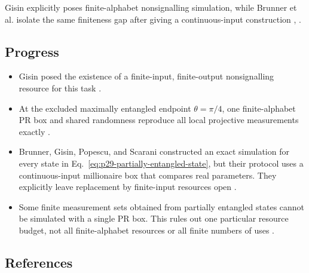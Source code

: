 Gisin explicitly poses finite-alphabet nonsignalling simulation, while
Brunner et al. isolate the same finiteness gap after giving a continuous-input
construction ,
.

\subsection*{Progress}

\begin{itemize}
  \item Gisin posed the existence of a finite-input, finite-output
  nonsignalling resource for this task
  .

  \item At the excluded maximally entangled endpoint $\theta=\pi/4$, one
  finite-alphabet PR box and shared randomness reproduce all local projective
  measurements exactly .

  \item Brunner, Gisin, Popescu, and Scarani constructed an exact simulation
  for every state in Eq.~\eqref{eq:p29-partially-entangled-state}, but their
  protocol uses a continuous-input millionaire box that compares real
  parameters.  They explicitly leave replacement by finite-input resources
  open .

  \item Some finite measurement sets obtained from partially entangled states
  cannot be simulated with a single PR box.  This rules out one particular
  resource budget, not all finite-alphabet resources or all finite numbers of
  uses .
\end{itemize}

\subsection*{References}

